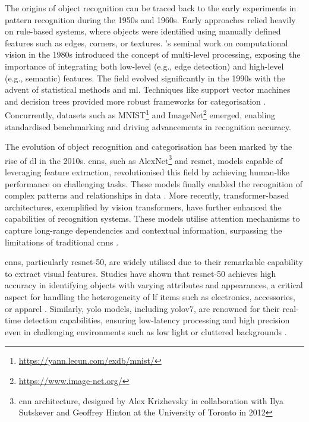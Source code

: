 The origins of object recognition can be traced back to the early experiments in pattern recognition during the 1950s and 1960s. Early approaches relied heavily on rule-based systems, where objects were identified using manually defined features such as edges, corners, or textures. 's seminal work on computational vision in the 1980s introduced the concept of multi-level processing, exposing the importance of integrating both low-level (e.g., edge detection) and high-level (e.g., semantic) features. The field evolved significantly in the 1990s with the advent of statistical methods and \ac{ml}. Techniques like support vector machines and decision trees provided more robust frameworks for categorisation \cite{Bishop2006}. Concurrently, datasets such as MNIST\footnote{\url{https://yann.lecun.com/exdb/mnist/}} and ImageNet\footnote{\url{https://www.image-net.org/}} emerged, enabling standardised benchmarking and driving advancements in recognition accuracy.

The evolution of object recognition and categorisation has been marked by the rise of \ac{dl} in the 2010s. \acp{cnn}, such as AlexNet\footnote{\ac{cnn} architecture, designed by Alex Krizhevsky in collaboration with Ilya Sutskever and Geoffrey Hinton at the University of Toronto in 2012} and \ac{resnet}, models capable of leveraging feature extraction, revolutionised this field by achieving human-like performance on challenging tasks. These models finally enabled the recognition of complex patterns and relationships in data \cites{He2015, Krizhevsky2017}. More recently, transformer-based architectures, exemplified by vision transformers, have further enhanced the capabilities of recognition systems. These models utilise attention mechanisms to capture long-range dependencies and contextual information, surpassing the limitations of traditional \acp{cnn} \cite{Dosovitskiy2020}.

\acp{cnn}, particularly \ac{resnet}-50, are widely utilised due to their remarkable capability to extract visual features. Studies have shown that {resnet}-50 achieves high accuracy in identifying objects with varying attributes and appearances, a critical aspect for handling the heterogeneity of \ac{lf} items such as electronics, accessories, or apparel \cites{Prawira2024, Ghazal2016, Liu2022}. Similarly, \ac{yolo} models, including \ac{yolo}v7, are renowned for their real-time detection capabilities, ensuring low-latency processing and high precision even in challenging environments such as low light or cluttered backgrounds \cites{Sharma2024, Vedanth2024}.

